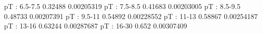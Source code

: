 pT : 6.5-7.5
0.32488 0.00205319
pT : 7.5-8.5
0.41683 0.00203005
pT : 8.5-9.5
0.48733 0.00207391
pT : 9.5-11
0.54892 0.00228552
pT : 11-13
0.58867 0.00254187
pT : 13-16
0.63244 0.00287687
pT : 16-30
0.652 0.00307409
